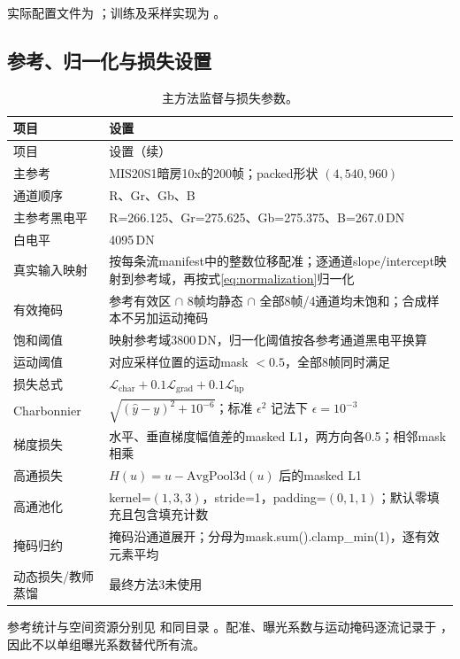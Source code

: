 \documentclass[11pt,a4paper,UTF8,fontset=fandol]{ctexart}
\newcommand{\dn}{\ensuremath{\,\mathrm{DN}}}
\begin{document}
实际配置文件为 ；训练及采样实现为 。

\subsection{参考、归一化与损失设置}

\begin{longtable}{P{0.27\textwidth}P{0.65\textwidth}}
\caption{主方法监督与损失参数。}\label{tab:loss_config}\\
\toprule 项目 & 设置 \\ \midrule
\endfirsthead
\toprule 项目 & 设置（续） \\ \midrule
\endhead
\bottomrule\endfoot
主参考 & MIS20S1暗房10x的200帧；packed形状 $(4,540,960)$ \\
通道顺序 & R、Gr、Gb、B \\
主参考黑电平 & R=266.125、Gr=275.625、Gb=275.375、B=267.0\dn \\
白电平 & 4095\dn \\
真实输入映射 & 按每条流manifest中的整数位移配准；逐通道slope/intercept映射到参考域，再按式\eqref{eq:normalization}归一化 \\
有效掩码 & 参考有效区 $\cap$ 8帧均静态 $\cap$ 全部8帧/4通道均未饱和；合成样本不另加运动掩码 \\
饱和阈值 & 映射参考域3800\dn，归一化阈值按各参考通道黑电平换算 \\
运动阈值 & 对应采样位置的运动mask $<0.5$，全部8帧同时满足 \\
损失总式 & $\mathcal L_{\mathrm{char}}+0.1\mathcal L_{\mathrm{grad}}+0.1\mathcal L_{\mathrm{hp}}$ \\
Charbonnier & $\sqrt{(\hat y-y)^2+10^{-6}}$；标准 $\epsilon^2$ 记法下 $\epsilon=10^{-3}$ \\
梯度损失 & 水平、垂直梯度幅值差的masked L1，两方向各0.5；相邻mask相乘 \\
高通损失 & $H(u)=u-\mathrm{AvgPool3d}(u)$ 后的masked L1 \\
高通池化 & kernel=$(1,3,3)$，stride=1，padding=$(0,1,1)$；默认零填充且包含填充计数 \\
掩码归约 & 掩码沿通道展开；分母为mask.sum().clamp\_min(1)，逐有效元素平均 \\
动态损失/教师蒸馏 & 最终方法3未使用 \\
\end{longtable}

参考统计与空间资源分别见  和同目录 。配准、曝光系数与运动掩码逐流记录于 ，因此不以单组曝光系数替代所有流。
\end{document}
